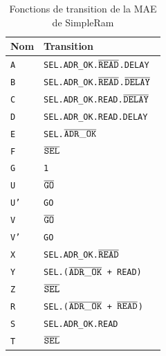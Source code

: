 \documentclass{article}
\begin{document}
\begin{table}[!htb]
\centering
\begingroup
\setlength{\tabcolsep}{5pt}
\renewcommand{\arraystretch}{1.1}
\begin{minipage}{.5\linewidth}
\centering
\caption{Fonctions de transition de la MAE de SimpleRam}
\begin{tabular}{ | l | l | }
\hline
Nom    &   Transition  \\
\hline
\texttt{A}  &   \tt{SEL.ADR\_OK.$\overline{\tt{READ}}$.DELAY                     }\\
\texttt{B}  &   \tt{SEL.ADR\_OK.$\overline{\tt{READ}}$.$\overline{\tt{DELAY}}$        }\\
\texttt{C}  &   \tt{SEL.ADR\_OK.READ.$\overline{\tt{DELAY}}$                     }\\
\texttt{D}  &   \tt{SEL.ADR\_OK.READ.DELAY                                  }\\
\texttt{E}  &   \tt{SEL.$\overline{\tt{ADR\_OK}}$                                }\\
\texttt{F}  &   \tt{$\overline{\tt{SEL}}$                                        }\\
\texttt{G}  &   \tt{1                                                       }\\
\hline
\texttt{U}  &   \tt{$\overline{\tt{GO}}$                                         }\\
\texttt{U'} &   \tt{GO                                                      }\\
\hline
\texttt{V}  &   \tt{$\overline{\tt{GO}}$                                         }\\
\texttt{V'} &   \tt{GO                                                      }\\
\hline
\texttt{X}  &   \tt{SEL.ADR\_OK.$\overline{\tt{READ}}$                           }\\
\texttt{Y}  &   \tt{SEL.($\overline{\tt{ADR\_OK}}$ + READ)                       }\\
\texttt{Z}  &   \tt{$\overline{\tt{SEL}}$                                        }\\
\hline
\texttt{R}  &   \tt{SEL.($\overline{\tt{ADR\_OK}}$ + $\overline{\tt{READ}}$)          }\\
\texttt{S}  &   \tt{SEL.ADR\_OK.READ                                        }\\
\texttt{T}  &   \tt{$\overline{\tt{SEL}}$                                        }\\
\hline
\end{tabular}

\end{minipage}
\end{table}
\end{document}
